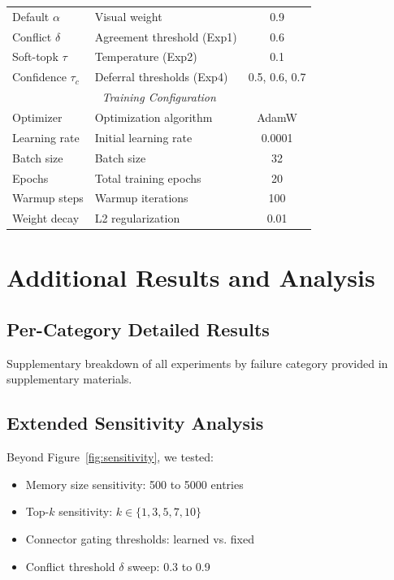 \documentclass[11pt]{article}
\begin{document}
\begin{table}[t]
\begin{tabular}{@{}llc@{}}
\midrule
Default $\alpha$   & Visual weight            & 0.9 \\
Conflict $\delta$  & Agreement threshold (Exp1) & 0.6 \\
Soft-topk $\tau$   & Temperature (Exp2)       & 0.1 \\
Confidence $\tau_c$& Deferral thresholds (Exp4) & 0.5, 0.6, 0.7 \\
\midrule
\multicolumn{3}{c}{\textit{Training Configuration}} \\
\midrule
Optimizer          & Optimization algorithm   & AdamW \\
Learning rate      & Initial learning rate    & 0.0001 \\
Batch size         & Batch size               & 32 \\
Epochs             & Total training epochs    & 20 \\
Warmup steps       & Warmup iterations        & 100 \\
Weight decay       & L2 regularization        & 0.01 \\
\bottomrule
\end{tabular}
\end{table}

\section{Additional Results and Analysis}
\label{app:additional}

\subsection{Per-Category Detailed Results}

Supplementary breakdown of all experiments by failure category provided in
supplementary materials.

\subsection{Extended Sensitivity Analysis}

Beyond Figure~\ref{fig:sensitivity}, we tested:
\begin{itemize}[leftmargin=*,itemsep=1pt]
  \item Memory size sensitivity: 500 to 5000 entries
  \item Top-$k$ sensitivity: $k \in \{1,3,5,7,10\}$
  \item Connector gating thresholds: learned vs. fixed
  \item Conflict threshold $\delta$ sweep: 0.3 to 0.9
\end{itemize}
\end{document}

